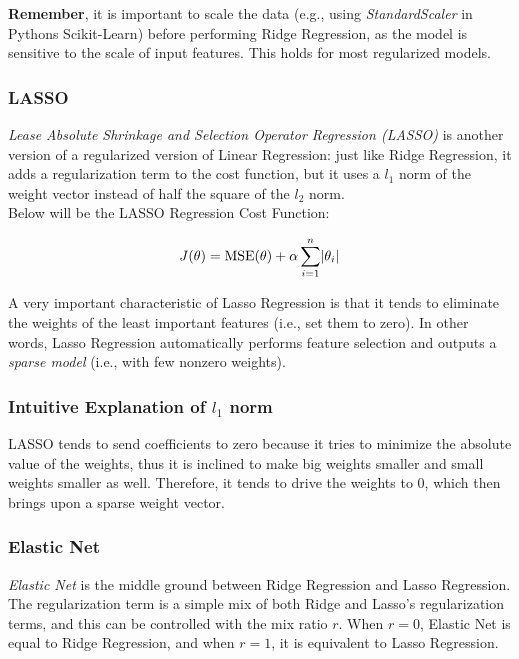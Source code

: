 \noindent 
\textbf{Remember}, it is important to scale the data 
(e.g., using \textit{StandardScaler} in Pythons Scikit-Learn) before performing Ridge Regression,
as the model is sensitive to the scale of input features. This holds for most regularized models.

\subsubsection{LASSO}

\textit{Lease Absolute Shrinkage and Selection Operator Regression (LASSO)} is another version
of a regularized version of Linear Regression: just like Ridge Regression, it adds a
regularization term to the cost function, but it uses a $l_{1}$ norm of the weight vector
instead of half the square of the $l_{2}$ norm. \\

\noindent
Below will be the LASSO Regression Cost Function:

$$J(\mathbf{\theta}) = \text{MSE}(\mathbf{\theta}) + \alpha \sum_{i = 1}^{n} \abs{\theta_{i}}$$

\noindent 
A very important characteristic of Lasso Regression is that it tends to eliminate the 
weights of the least important features (i.e., set them to zero). In other words, Lasso Regression
automatically performs feature selection and outputs a \textit{sparse model} (i.e., with few
nonzero weights).\\

\subsubsection*{Intuitive Explanation of $l_{1}$ norm}
\noindent 
LASSO tends to send coefficients to zero because it tries to minimize the absolute value
of the weights, thus it is inclined to make big weights smaller and small weights smaller as well. 
Therefore, it tends to drive the weights to 0, which then brings upon a sparse weight vector.

\subsubsection{Elastic Net}

\textit{Elastic Net} is the middle ground between Ridge Regression and Lasso Regression. The 
regularization term is a simple mix of both Ridge and Lasso's regularization terms, and this can be 
controlled with the mix ratio $r$. When $r = 0$, Elastic Net is equal to Ridge Regression, and when
$r = 1$, it is equivalent to Lasso Regression. \\


